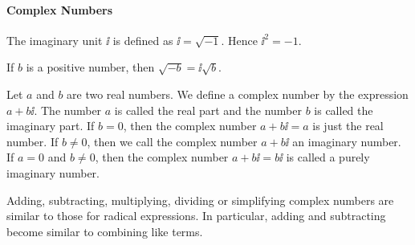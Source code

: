 

\paragraph*{Complex Numbers}

	The imaginary unit $\ii$ is defined as $\ii=\sqrt{-1}$. Hence $\ii^2=-1$.

	If $b$ is a positive number, then $\sqrt{-b}=\ii\sqrt{b}$.

	Let $a$ and $b$ are two real numbers. We define a complex number by the expression $a+b \ii$.
	The number $a $ is called the real part and the number $b$ is called the imaginary part. If $b=0$,
	then the complex number $a+b\ii=a$ is just the real number.
	If $b\neq 0$, then we call the complex number $a+b\ii$ an imaginary number.
	If $a=0$ and $b\neq 0$, then the complex number $a+b\ii=b\ii$ is called a purely imaginary number.

	Adding, subtracting, multiplying, dividing or simplifying complex numbers are similar to those for radical expressions.
	In particular, adding and subtracting become similar to combining like terms.


